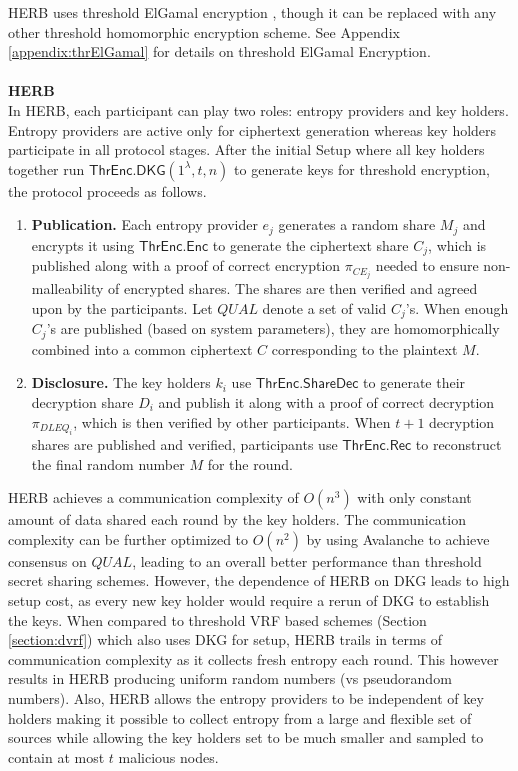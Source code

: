 \documentclass[letterpaper,twocolumn,10pt]{article}
\theoremstyle{definition}
\theoremstyle{remark}
\begin{document}
HERB \cite{cherniaeva2019homomorphic} uses threshold ElGamal encryption \cite{desmedt1990Threshold}, though it can be replaced with any other threshold homomorphic encryption scheme. See Appendix \ref{appendix:thrElGamal} for details on threshold ElGamal Encryption.\\\\
\textbf{HERB}\\
In HERB, each participant can play two roles: entropy providers and key holders. Entropy providers are active only for ciphertext generation whereas key holders participate in all protocol stages. After the initial Setup where all key holders together run $\mathsf{ThrEnc.DKG}(1^\lambda, t, n)$ to generate keys for threshold encryption, the protocol proceeds as follows.
\begin{enumerate}
    \item \textbf{Publication.} Each entropy provider $e_j$ generates a random share $M_j$ and encrypts it using $\mathsf{ThrEnc.Enc}$ to generate the ciphertext share $C_j$, which is published along with a proof of correct encryption $\pi_{CE_{j}}$ needed to ensure non-malleability of encrypted shares. The shares are then verified and agreed upon by the participants. Let $QUAL$ denote a set of valid $C_j$'s. When enough $C_j$'s are published (based on system parameters), they are homomorphically combined into a common ciphertext $C$ corresponding to the plaintext $M$.
    
    \item \textbf{Disclosure.} The key holders $k_i$ use $\mathsf{ThrEnc.ShareDec}$ to generate their decryption share $D_i$ and publish it along with a proof of correct decryption $\pi_{DLEQ_{i}}$, which is then verified by other participants. When $t + 1$ decryption shares are published and verified, participants use $\mathsf{ThrEnc.Rec}$ to reconstruct the final random number $M$ for the round.
\end{enumerate}
HERB achieves a communication complexity of $O(n^3)$ with only constant amount of data shared each round by the key holders. The communication complexity can be further optimized to $O(n^2)$ by using Avalanche \cite{rocket2018snowflake} to achieve consensus on $QUAL$, leading to an overall better performance than threshold secret sharing schemes. However, the dependence of HERB on DKG leads to high setup cost, as every new key holder would require a rerun of DKG to establish the keys. When compared to threshold VRF based schemes (Section \ref{section:dvrf}) which also uses DKG for setup, HERB trails in terms of communication complexity as it collects fresh entropy each round. This however results in HERB producing uniform random numbers (vs pseudorandom numbers). Also, HERB allows the entropy providers to be independent of key holders making it possible to collect entropy from a large and flexible set of sources while allowing the key holders set to be much smaller and sampled to contain at most $t$ malicious nodes.
\end{document}
